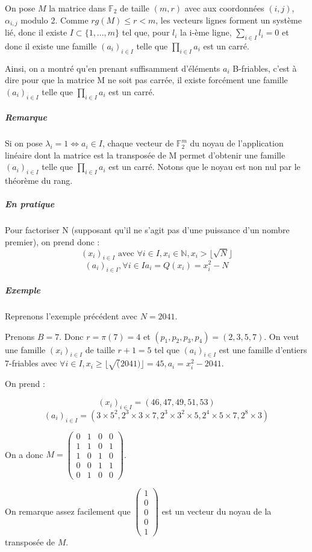 \documentclass[11pt,a4paper]{article}
\begin{document}
	On pose $M$ la matrice dans $\mathbb{F}_2$ de taille $(m,r)$ avec aux coordonnées $(i,j)$,  $\alpha_{i,j}$ modulo 2. 
	Comme $rg(M) \le r < m$, les vecteurs lignes forment un système lié, donc il existe $I \subset \{1, ..., m\}$ tel que, pour $l_i$ la i-ème ligne, $\sum_{i \in I} l_i = 0$ et donc il existe une famille $(a_i)_{i \in I}$ telle que $\prod_{i \in I} a_i$ est un carré. 
	
	Ainsi, on a montré qu'en prenant suffisamment d'éléments $a_i$ B-friables, c'est à dire pour que la matrice M ne soit pas carrée, il existe forcément une famille $(a_i)_{i \in I}$ telle que $\prod_{i \in I} a_i$ est un carré.
	
	\subparagraph{Remarque}
	Si on pose $\lambda_i = 1 \iff a_i \in I$, chaque vecteur de $\mathbb{F}_2^{m}$  du noyau de l'application linéaire dont la matrice est la transposée de M permet d'obtenir une famille $(a_i)_{i \in I}$ telle que $\prod_{i \in I} a_i$ est un carré. Notons que le noyau est non nul par le théorème du rang.
	
	
	\subparagraph{En pratique}
	Pour factoriser N (supposant qu'il ne s'agit pas d'une puissance d'un nombre premier), on prend donc : 
	$$(x_i)_{i \in I} \text{ avec } \forall i \in I, x_i \in \mathbb{N}, x_i > \lfloor \sqrt{N} \rfloor$$
	$$ (a_i)_{i \in I}, \forall i \in I a_i = Q(x_i) = x_i^2 - N$$
	
	\subparagraph{Exemple}
	Reprenons l'exemple précédent avec $N = 2041$.
	
	Prenons $B = 7$. Donc $r = \pi(7) = 4$ et $(p_1, p_2, p_3, p_4) = (2, 3, 5, 7)$.
	On veut une famille $(x_i)_{i \in I}$ de taille $r+1 = 5$ tel que $(a_i)_{i \in I}$ est une famille d'entiers 7-friables avec $\forall i \in I, x_i \ge \lfloor \sqrt(2041) \rfloor = 45, a_i = x_i^2 - 2041$. 
	
	On prend : 
	
	$$(x_i)_{i \in I} = (46, 47, 49, 51, 53)$$
	$$(a_i)_{i \in I} = (3 \times 5^2, 2^3 \times 3 \times 7, 2^3 \times 3^2 \times 5, 2^4 \times 5 \times 7, 2^8 \times 3)$$
	
	On a donc $M = 
	\begin{pmatrix}
		0 & 1 & 0 & 0 \\
		1 & 1 & 0 & 1 \\
		1 & 0 & 1 & 0 \\
		0 & 0 & 1 & 1 \\
		0 & 1 & 0 & 0 
	\end{pmatrix}$.

 	On remarque assez facilement que 
 	$\begin{pmatrix}
 		1\\
 		0\\
 		0\\
 		0\\
 		1
 	\end{pmatrix}$ est un vecteur du noyau de la transposée de $M$.
 
\end{document}
